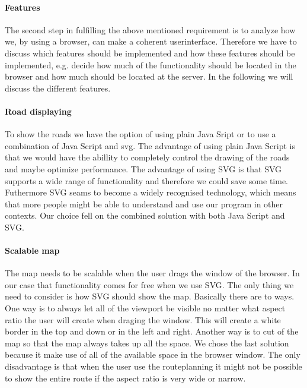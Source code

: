 \documentclass[a4paper,10pt,titlepage]{article}
\begin{document}
\paragraph{Features}
The second step in fulfilling the above mentioned requirement is to analyze how we, by using a browser, can make a coherent userinterface. Therefore we have to discuss which features should be implemented and how these features should be implemented, e.g. decide how much of the functionality should be located in the browser and how much should be located at the server. In the following we will discuss the different features.
\paragraph{Road displaying}
To show the roads we have the option of using plain Java Sript or to use a combination of Java Script and svg. The advantage of using plain Java Script is that we would have the abillity to completely control the drawing of the roads and maybe optimize performance. The advantage of using SVG is that SVG supports a wide range of functionality and therefore we could save some time. Futhermore SVG seams to become a widely recognised technology, which means that more people might be able to understand and use our program in other contexts. Our choice fell on the combined solution with both Java Script and SVG. 
 
\paragraph{Scalable map}
The map needs to be scalable when the user drags the window of the browser. In our case that functionality comes for free when we use SVG. The only thing we need to consider is how SVG should show the map. Basically there are to ways. One way is to always let all of the viewport be visible no matter what aspect ratio the user will create when draging the window. This will create a white border in the top and down or in the left and right. Another way is to cut of the map so that the map always takes up all the space. We chose the last solution because it make use of all of the available space in the browser window. The only disadvantage is that when the user use the routeplanning it might not be possible to show the entire route if the aspect ratio is very wide or narrow. 
\end{document}
